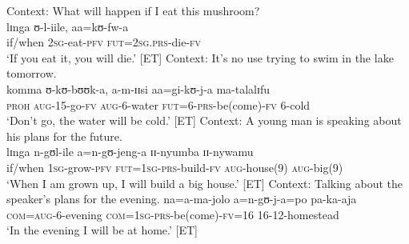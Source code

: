 \begin{exe}
\ex \label{exAaPRSnoIntention1} Context: What will happen if I eat this mushroom?\\
\gll lɪnga ʊ-l-iile, aa=kʊ-fw-a\\
if/when \textsc{2sg}-eat-\textsc{pfv} \textsc{fut}=\textsc{2sg.prs}-die-\textsc{fv}\\
\glt `If you eat it, you will die.' [ET]
\ex \label{exAaPRSnoIntention2} Context: It's no use trying to swim in the lake tomorrow.\\
\gll komma ʊ-kʊ-bʊʊk-a, a-m-ɪɪsi aa=gi-kʊ-j-a ma-talalɪfu\\
\textsc{proh} \textsc{aug}-15-go-\textsc{fv} \textsc{aug}-6-water \textsc{fut}=6-\textsc{prs}-be(come)-\textsc{fv} 6-cold\\
\glt `Don't go, the water will be cold.' [ET]
\ex \label{exAaPRSwithIntention1}Context: A young man is speaking about his plans for the future.\\
\gll lɪnga n-gʊl-ile a=n-gʊ-jeng-a ɪɪ-nyumba ɪɪ-nywamu\\
if/when \textsc{1sg}-grow-\textsc{pfv} \textsc{fut}=\textsc{1sg}-\textsc{prs}-build-\textsc{fv} \textsc{aug}-house(9) \textsc{aug}-big(9)\\
\glt `When I am grown up, I will build a big house.' [ET]
\ex \label{exAaPRSwithIntention2} Context: Talking about the speaker's plans for the evening.
\gll na=a-ma-jolo a=n-gʊ-j-a=po pa-ka-aja\\
\textsc{com}=\textsc{aug}-6-evening \textsc{com}=\textsc{1sg}-\textsc{prs}-be(come)-\textsc{fv}=16 16-12-homestead\\
\glt `In the evening I will be at home.' [ET]
\end{exe}

